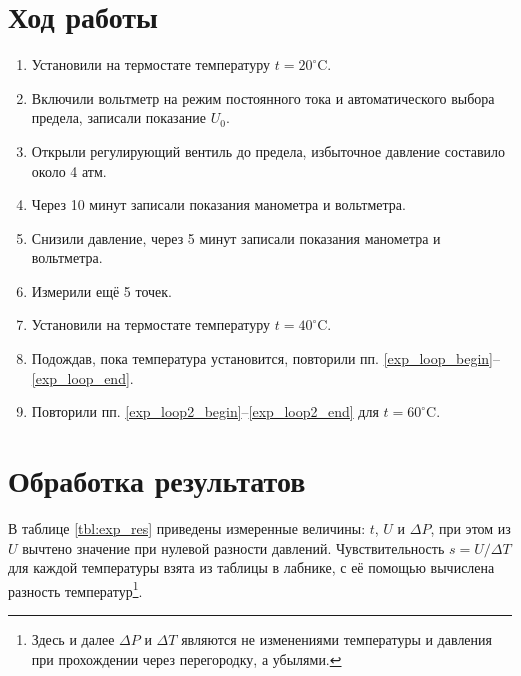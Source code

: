 \documentclass[12pt]{article}
\begin{document}
	\section*{Ход работы}
	
	\begin{enumerate}
	\item Установили на термостате температуру $t=20 ^\circ\text{C}$.
	\item Включили вольтметр на режим постоянного тока и автоматического выбора предела, записали показание $U_0$.
	\item Открыли регулирующий вентиль до предела, избыточное давление составило около 4 атм. \label{exp_loop_begin}
	\item Через 10 минут записали показания манометра и вольтметра.
	\item Снизили давление, через 5 минут записали показания манометра и вольтметра.
	\item Измерили ещё 5 точек. \label{exp_loop_end}
	\item Установили на термостате температуру $t=40 ^\circ\text{C}$. \label{exp_loop2_begin}
	\item Подождав, пока температура установится, повторили пп. \ref{exp_loop_begin}--\ref{exp_loop_end}. \label{exp_loop2_end}
	\item Повторили пп. \ref{exp_loop2_begin}--\ref{exp_loop2_end} для $t=60 ^\circ\text{C}$.
	\end{enumerate}
	
	\section*{Обработка результатов}
	
	В таблице \ref{tbl:exp_res} приведены измеренные величины: $t$, $U$ и $\Delta P$, при этом из $U$ вычтено значение при нулевой разности давлений. Чувствительность $s=U/\Delta T$ для каждой температуры взята из таблицы в лабнике, с её помощью вычислена разность температур\footnote{Здесь и далее $\Delta P$ и $\Delta T$ являются не изменениями температуры и давления при прохождении через перегородку, а убылями.}.
	
\end{document}
